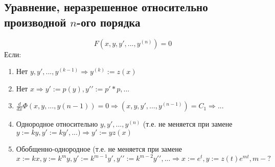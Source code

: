 \documentclass[a5paper,10pt]{article}
\begin{document}
		\subsection{Уравнение, неразрешенное относительно производной $n$-ого порядка}
			$$ F(x,y,y\prime,...,y^{(n)}) = 0 $$
			Если:
			\begin{enumerate}
				\item Нет $ y,y\prime,...,y^{(k-1)} \Rightarrow y^{(k)} := z(x) $
				
				\item Нет $ x \Rightarrow y\prime:=p(y), y\prime\prime:=p\prime*p, ... $
				
				\item $ \frac{d}{dx}\Phi(x, y, ..., y(n-1))=0 \Rightarrow (x, y, y\prime, ..., y^{(n-1)}) = C_1 \Rightarrow ... $
				
				\item Однородное относительно $ y,y\prime,...,y^{(n)} $ (т.е. не меняется при замене $ y := ky, y\prime:=ky\prime, ...) \Rightarrow y\prime:=yz(x) $
				
				\item Обобщенно-однородное (т.е. не меняется при замене $ x:=kx, y:=k^m y, y\prime:=k^{m-1}y\prime, y\prime\prime:=k^{m-2}y\prime\prime, ...\Rightarrow x:=e^t, y:=z(t)e^{mt}, m - ? $
			\end{enumerate}
\end{document}
